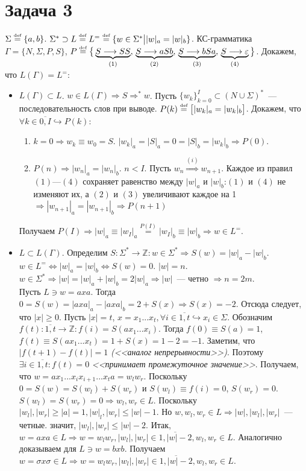 \documentclass[a4paper]{article}
\def\eqdef{\overset{\mbox{\tiny def}}{=}}
\begin{document}
\section*{Задача 3}
$\Sigma\eqdef\{a,b\}$. $\Sigma^*\supset L\eqdef L^=\eqdef\{w\in\Sigma^*\big||w|_a=|w|_b\}$. КС-грамматика $\Gamma=\{N,\Sigma,P,S\}$,\newline
$P\eqdef\big\{\underbrace{S\longrightarrow SS}_{(1)},\,\underbrace{S\longrightarrow aSb}_{(2)},\,\underbrace{S\longrightarrow bSa}_{(3)},\,\underbrace{S\longrightarrow \varepsilon}_{(4)}\big\}$.\newline
Докажем, что $L(\Gamma)=L^=$:\begin{itemize}
\item $L(\Gamma)\subset L$. $w\in L(\Gamma)\Rightarrow S\Longrightarrow^* w$. Пусть $\{w_k\}_{k=0}^I\subset (N\cup \Sigma)^*$~--- последовательность слов при выводе.\newline
$P(k)\eqdef\big[|w_k|_a=|w_k|_b\big]$. Докажем, что $\forall k\in\overline{0,I}\hookrightarrow P(k)$:\begin{enumerate}[1.]
\item $k=0\Rightarrow w_k\equiv w_0=S$. $|w_k|_a=|S|_a=0=|S|_b=|w_k|_b\Rightarrow P(0)$.
\item $P(n)\Rightarrow |w_n|_a=|w_n|_b$. $n<I$. Пусть $w_n\overset{(i)}{\Longrightarrow}w_{n+1}$. Каждое из правил $(1)$---$(4)$ сохраняет равенство между $|w|_a$ и $|w|_b$:\newline$(1)$ и $(4)$ не изменяют их, а $(2)$ и $(3)$ увеличивают каждое на 1 $\Rightarrow |w_{n+1}|_a=|w_{n+1}|_b\Rightarrow P(n+1)$
\end{enumerate}
Получаем $P(I)\Rightarrow |w|_a\equiv|w_I|_a\overset{P(I)}{=}|w_I|_b\equiv|w|_b\Rightarrow w\in L^=$.
\item $L\subset L(\Gamma)$.\newline
Определим $S\colon \Sigma^*\longrightarrow {\mathbb Z}\colon w\in\Sigma^*\Rightarrow S(w)=|w|_a-|w|_b$.
$w\in L^=\Leftrightarrow |w|_a=|w|_b\Leftrightarrow S(w)=0$. $|w|=n$. $w\in\Sigma^*\Rightarrow|w|=|w|_a+|w|_b=2|w|_a\Rightarrow |w|$~--- четно $\Rightarrow n=2m$.
\\[5pt]
Пусть $L\ni w=axa$. Тогда $0=S(w)=|axa|_a-|axa|_b=2+S(x)\Rightarrow S(x)=-2$. Отсюда следует, что $|x|\geqslant 0$. Пусть $|x|=t$, $x=x_1...x_t,\forall i\in\overline{1,t}\hookrightarrow x_i\in\Sigma$. Обозначим $f(t)\colon \overline{1,t}\longrightarrow {\mathbb Z}\colon f(i)=S(ax_1...x_i)$. Тогда $f(0)\equiv S(a)=1$, $f(t)\equiv S(ax_1...x_t)=1+S(x)=1-2=-1$. Заметим, что $|f(t+1)-f(t)|=1$ {\em (<<аналог непрерывности>>)}. Поэтому $\exists i\in\overline{1,t}\colon f(t)=0$ {\em <<принимает промежуточное значение>>}. Получаем, что $w=ax_1...x_ix_{i+1}...x_ta=w_lw_r$. Поскольку $0=S(w)=S(w_l)+S(w_r)$ и $S(w_l)\equiv f(i)=0$, $S(w_r)=0$. $S(w_l)=S(w_r)=0\Rightarrow w_l,w_r\in L$. Поскольку $|w_l|,|w_r|\geqslant |a|=1, |w|_l,|w_r|\leqslant |w|-1$. Но $w,w_l,w_r\in L\Rightarrow |w|,|w_l|,|w_r|$~--- четные. значит, $|w_l|,|w_r|\leqslant |w|-2$. Итак, $w=axa\in L\Rightarrow w=w_lw_r, |w_l|, |w_r|\in\overline{1, |w|-2}, w_l,w_r\in L$. Аналогично доказываем для $L\ni w=bxb$. Получаем $\boxed{w=\sigma x\sigma\in L\Rightarrow w=w_lw_r, |w_l|, |w_r|\in\overline{1, |w|-2}, w_l,w_r\in L}$.

\end{itemize}
\end{document}
